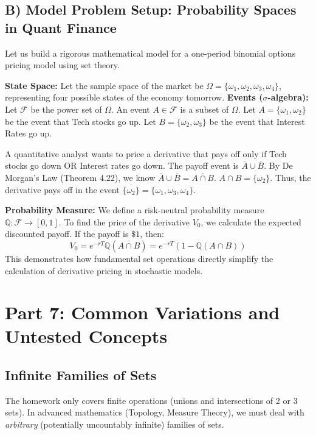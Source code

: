 \documentclass[11pt, a4paper]{article}
\theoremstyle{definition}
\theoremstyle{remark}
\begin{document}
\subsection{B) Model Problem Setup: Probability Spaces in Quant Finance}
Let us build a rigorous mathematical model for a one-period binomial options pricing model using set theory.

\textbf{State Space:} Let the sample space of the market be $\Omega = \{\omega_1, \omega_2, \omega_3, \omega_4\}$, representing four possible states of the economy tomorrow.
\textbf{Events ($\sigma$-algebra):} Let $\mathcal{F}$ be the power set of $\Omega$. An event $A \in \mathcal{F}$ is a subset of $\Omega$.
Let $A = \{\omega_1, \omega_2\}$ be the event that Tech stocks go up.
Let $B = \{\omega_2, \omega_3\}$ be the event that Interest Rates go up.

A quantitative analyst wants to price a derivative that pays off only if Tech stocks go down OR Interest rates go down. 
The payoff event is $\overline{A} \cup \overline{B}$.
By De Morgan's Law (Theorem 4.22), we know $\overline{A} \cup \overline{B} = \overline{A \cap B}$.
$A \cap B = \{\omega_2\}$. Thus, the derivative pays off in the event $\overline{\{\omega_2\}} = \{\omega_1, \omega_3, \omega_4\}$.

\textbf{Probability Measure:} We define a risk-neutral probability measure $\mathbb{Q}: \mathcal{F} \to [0,1]$. 
To find the price of the derivative $V_0$, we calculate the expected discounted payoff. If the payoff is $\$1$, then:
\[
    V_0 = e^{-rT} \mathbb{Q}(\overline{A \cap B}) = e^{-rT} \left( 1 - \mathbb{Q}(A \cap B) \right)
\]
This demonstrates how fundamental set operations directly simplify the calculation of derivative pricing in stochastic models.

\section{Part 7: Common Variations and Untested Concepts}

\subsection{Infinite Families of Sets}
The homework only covers finite operations (unions and intersections of 2 or 3 sets). In advanced mathematics (Topology, Measure Theory), we must deal with \textit{arbitrary} (potentially uncountably infinite) families of sets.
\end{document}
